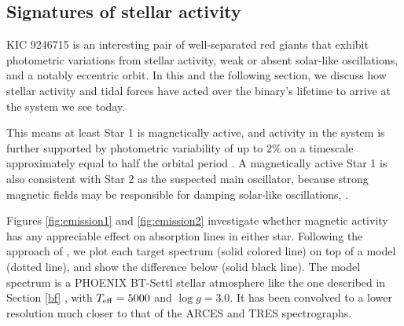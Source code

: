 \subsection{Signatures of stellar activity}\label{actrot}
KIC 9246715 is an interesting pair of well-separated red giants that exhibit photometric variations from stellar activity, weak or absent solar-like oscillations, and a notably eccentric orbit. In this and the following section, we discuss how stellar activity and tidal forces have acted over the binary's lifetime to arrive at the system we see today. 

 This means at least Star 1 is magnetically active, and activity in the system is further supported by photometric variability of up to 2\% on a timescale approximately equal to half the orbital period \citep{gau14}. A magnetically active Star 1 is also consistent with Star 2 as the suspected main oscillator, because strong magnetic fields may be responsible for damping solar-like oscillations, .

Figures \ref{fig:emission1} and \ref{fig:emission2} investigate whether magnetic activity has any appreciable effect on absorption lines in either star. Following the approach of \citet{fro12}, we plot each target spectrum (solid colored line) on top of a model (dotted line), and show the difference below (solid black line). The model spectrum is a PHOENIX BT-Settl stellar atmosphere like the one described in Section \ref{bf} \citep{all03,asp09}, with $T_{\rm{eff}} = 5000$ and $\log g = 3.0$. It has been convolved to a lower resolution much closer to that of the ARCES and TRES spectrographs.

